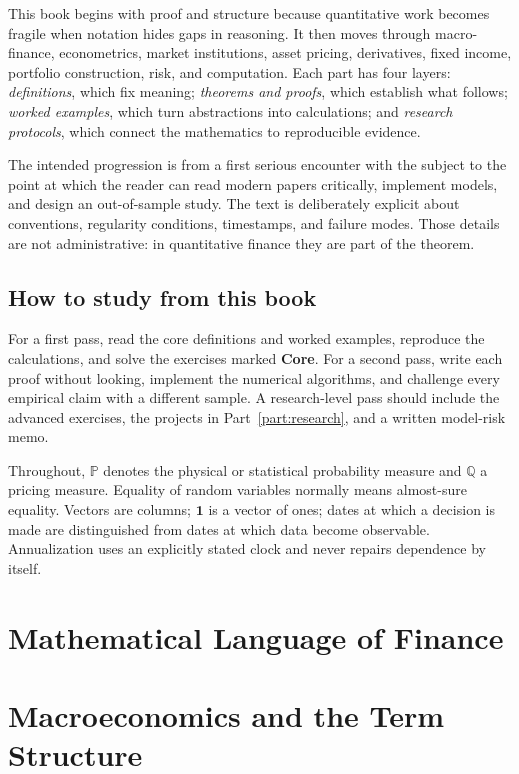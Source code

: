 \documentclass[12pt,oneside,openany]{book}
\begin{document}
This book begins with proof and structure because quantitative work becomes fragile
when notation hides gaps in reasoning. It then moves through macro-finance,
econometrics, market institutions, asset pricing, derivatives, fixed income,
portfolio construction, risk, and computation. Each part has four layers:
\emph{definitions}, which fix meaning; \emph{theorems and proofs}, which establish
what follows; \emph{worked examples}, which turn abstractions into calculations; and
\emph{research protocols}, which connect the mathematics to reproducible evidence.

The intended progression is from a first serious encounter with the subject to the
point at which the reader can read modern papers critically, implement models, and
design an out-of-sample study. The text is deliberately explicit about conventions,
regularity conditions, timestamps, and failure modes. Those details are not
administrative: in quantitative finance they are part of the theorem.

\chapter*{How to study from this book}
For a first pass, read the core definitions and worked examples, reproduce the
calculations, and solve the exercises marked \textbf{Core}. For a second pass, write
each proof without looking, implement the numerical algorithms, and challenge every
empirical claim with a different sample. A research-level pass should include the
advanced exercises, the projects in Part~\ref{part:research}, and a written model-risk
memo.

Throughout, $\mathbb P$ denotes the physical or statistical probability measure and
$\mathbb Q$ a pricing measure. Equality of random variables normally means almost-sure
equality. Vectors are columns; $\bm 1$ is a vector of ones; dates at which a decision
is made are distinguished from dates at which data become observable. Annualization
uses an explicitly stated clock and never repairs dependence by itself.

\tableofcontents

\mainmatter
\part{Mathematical Language of Finance}\label{part:mathematics}


\part{Macroeconomics and the Term Structure}\label{part:macro}

\end{document}
